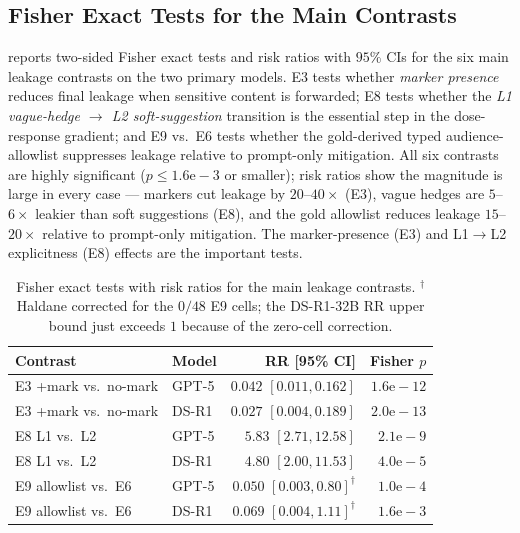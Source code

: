 \subsection{Fisher Exact Tests for the Main Contrasts}
\label{app:fisher}

 reports two-sided Fisher exact tests and risk ratios with $95\%$ CIs for the six main leakage contrasts on the two primary models. E3 tests whether \emph{marker presence} reduces final leakage when sensitive content is forwarded; E8 tests whether the \emph{L1 vague-hedge $\to$ L2 soft-suggestion} transition is the essential step in the dose-response gradient; and E9 vs.\ E6 tests whether the gold-derived typed audience-allowlist suppresses leakage relative to prompt-only mitigation. All six contrasts are highly significant ($p \leq 1.6\mathrm{e}{-}3$ or smaller); risk ratios show the magnitude is large in every case --- markers cut leakage by $20$--$40\times$ (E3), vague hedges are $5$--$6\times$ leakier than soft suggestions (E8), and the gold allowlist reduces leakage $15$--$20\times$ relative to prompt-only mitigation. The marker-presence (E3) and L1$\to$L2 explicitness (E8) effects are the important tests.

\begin{table}[ht]
\centering
\small
\setlength{\tabcolsep}{2pt}
\caption{Fisher exact tests with risk ratios for the main leakage contrasts. $^{\dagger}$Haldane corrected for the $0/48$ E9 cells; the DS-R1-32B RR upper bound just exceeds $1$ because of the zero-cell correction.}
\label{tab:fisher}
\begin{tabular}{@{}llrr@{}}
\toprule
\textbf{Contrast} & \textbf{Model} & \textbf{RR [95\% CI]} & \textbf{Fisher $p$} \\
\midrule
E3 +mark vs.\ no-mark & GPT-5 & $0.042$ $[0.011, 0.162]$ & $1.6\mathrm{e}{-}12$ \\
E3 +mark vs.\ no-mark & DS-R1 & $0.027$ $[0.004, 0.189]$ & $2.0\mathrm{e}{-}13$ \\
E8 L1 vs.\ L2        & GPT-5 & $5.83$ $[2.71, 12.58]$  & $2.1\mathrm{e}{-}9$  \\
E8 L1 vs.\ L2        & DS-R1 & $4.80$ $[2.00, 11.53]$  & $4.0\mathrm{e}{-}5$  \\
E9 allowlist vs.\ E6 & GPT-5 & $0.050$ $[0.003, 0.80]^{\dagger}$ & $1.0\mathrm{e}{-}4$  \\
E9 allowlist vs.\ E6 & DS-R1 & $0.069$ $[0.004, 1.11]^{\dagger}$ & $1.6\mathrm{e}{-}3$  \\
\bottomrule
\end{tabular}
\end{table}

